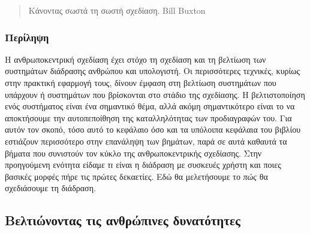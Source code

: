 \documentclass[
]{article}
\begin{document}
\begin{quote}
Κάνοντας σωστά τη σωστή σχεδίαση. Bill Buxton
\end{quote}

\hypertarget{ux3c0ux3b5ux3c1ux3afux3bbux3b7ux3c8ux3b7}{%
\subsubsection{Περίληψη}\label{ux3c0ux3b5ux3c1ux3afux3bbux3b7ux3c8ux3b7}}

Η ανθρωποκεντρική σχεδίαση έχει στόχο τη σχεδίαση και τη βελτίωση των
συστημάτων διάδρασης ανθρώπου και υπολογιστή. Οι περισσότερες τεχνικές,
κυρίως στην πρακτική εφαρμογή τους, δίνουν έμφαση στη βελτίωση
συστημάτων που υπάρχουν ή συστημάτων που βρίσκονται στο στάδιο της
σχεδίασης. Η βελτιστοποίηση ενός συστήματος είναι ένα σημαντικό θέμα,
αλλά ακόμη σημαντικότερο είναι το να αποκτήσουμε την αυτοπεποίθηση της
καταλληλότητας των προδιαγραφών του. Για αυτόν τον σκοπό, τόσο αυτό το
κεφάλαιο όσο και τα υπόλοιπα κεφάλαια του βιβλίου εστιάζουν περισσότερο
στην επανάληψη των βημάτων, παρά σε αυτά καθαυτά τα βήματα που συνιστούν
τον κύκλο της ανθρωποκεντρικής σχεδίασης. Στην προηγούμενη ενότητα
είδαμε \emph{τι} είναι η διάδραση με συσκευές χρήστη και ποιες βασικές
μορφές πήρε τις πρώτες δεκαετίες. Εδώ θα μελετήσουμε το \emph{πώς} θα
σχεδιάσουμε τη διάδραση.

\hypertarget{ux3b2ux3b5ux3bbux3c4ux3b9ux3ceux3bdux3bfux3bdux3c4ux3b1ux3c2-ux3c4ux3b9ux3c2-ux3b1ux3bdux3b8ux3c1ux3ceux3c0ux3b9ux3bdux3b5ux3c2-ux3b4ux3c5ux3bdux3b1ux3c4ux3ccux3c4ux3b7ux3c4ux3b5ux3c2}{%
\subsection{Βελτιώνοντας τις ανθρώπινες
δυνατότητες}\label{ux3b2ux3b5ux3bbux3c4ux3b9ux3ceux3bdux3bfux3bdux3c4ux3b1ux3c2-ux3c4ux3b9ux3c2-ux3b1ux3bdux3b8ux3c1ux3ceux3c0ux3b9ux3bdux3b5ux3c2-ux3b4ux3c5ux3bdux3b1ux3c4ux3ccux3c4ux3b7ux3c4ux3b5ux3c2}}
\end{document}
